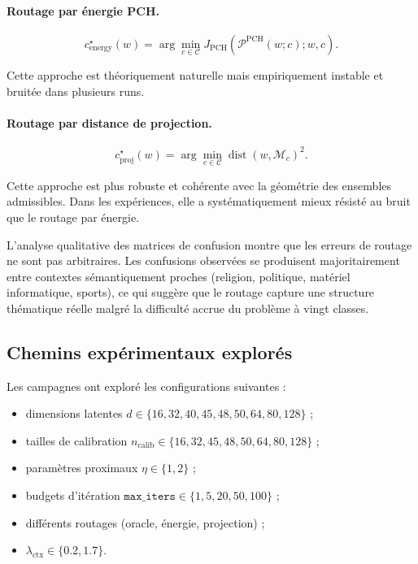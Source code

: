\documentclass[11pt,a4paper]{article}
\newcommand{\1}{\mathbf 1}
\begin{document}
\paragraph{Routage par énergie PCH.}
\[
c^\star_{\mathrm{energy}}(w)
=
\arg\min_{c\in\mathcal C}
J_{\mathrm{PCH}}(\mathcal P^{\mathrm{PCH}}(w;c);w,c).
\]

Cette approche est théoriquement naturelle mais empiriquement instable et bruitée dans plusieurs runs.

\paragraph{Routage par distance de projection.}
\[
c^\star_{\mathrm{proj}}(w)
=
\arg\min_{c\in\mathcal C}\operatorname{dist}(w,\mathcal M_c)^2.
\]

Cette approche est plus robuste et cohérente avec la géométrie des ensembles admissibles. Dans les expériences, elle a systématiquement mieux résisté au bruit que le routage par énergie.

L’analyse qualitative des matrices de confusion montre que les erreurs de routage ne sont pas arbitraires. Les confusions observées se produisent majoritairement entre contextes sémantiquement proches (religion, politique, matériel informatique, sports), ce qui suggère que le routage capture une structure thématique réelle malgré la difficulté accrue du problème à vingt classes.

\subsection{Chemins expérimentaux explorés}

Les campagnes ont exploré les configurations suivantes :
\begin{itemize}[leftmargin=2em]
    \item dimensions latentes \(d \in \{16,32,40,45,48,50,64,80,128\}\) ;
    \item tailles de calibration \(n_{\mathrm{calib}} \in \{16,32,45,48,50,64,80,128\}\) ;
    \item paramètres proximaux \(\eta \in \{1,2\}\) ;
    \item budgets d’itération \(\texttt{max\_iters} \in \{1,5,20,50,100\}\) ;
    \item différents routages (oracle, énergie, projection) ;
    \item \(\lambda_{\mathrm{ctx}} \in \{0.2, 1.7\}\).
\end{itemize}
\end{document}
